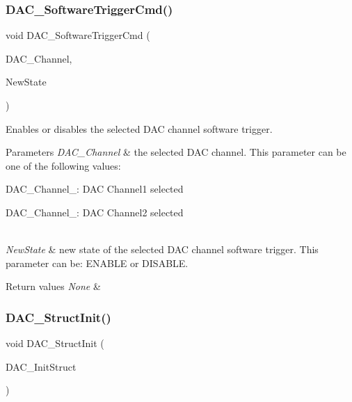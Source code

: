 \subsubsection{\texorpdfstring{DAC\_SoftwareTriggerCmd()}{DAC\_SoftwareTriggerCmd()}}
{\footnotesize\ttfamily void D\+A\+C\+\_\+\+Software\+Trigger\+Cmd (\begin{DoxyParamCaption}\item[{uint32\+\_\+t}]{D\+A\+C\+\_\+\+Channel,  }\item[{\mbox{\hyperlink{group___exported__types_gac9a7e9a35d2513ec15c3b537aaa4fba1}{Functional\+State}}}]{New\+State }\end{DoxyParamCaption})}



Enables or disables the selected D\+AC channel software trigger. 


\begin{DoxyParams}{Parameters}
{\em D\+A\+C\+\_\+\+Channel} & the selected D\+AC channel. This parameter can be one of the following values\+: \begin{DoxyItemize}
\item D\+A\+C\+\_\+\+Channel\+\_\+: D\+AC Channel1 selected \item D\+A\+C\+\_\+\+Channel\+\_\+: D\+AC Channel2 selected \end{DoxyItemize}
\\
\hline
{\em New\+State} & new state of the selected D\+AC channel software trigger. This parameter can be\+: E\+N\+A\+B\+LE or D\+I\+S\+A\+B\+LE. \\
\hline
\end{DoxyParams}

\begin{DoxyRetVals}{Return values}
{\em None} & \\
\hline
\end{DoxyRetVals}
\mbox{\label{group___d_a_c___private___functions_gadfc270974d54cb5fa5f92556015c4046}} 
\subsubsection{\texorpdfstring{DAC\_StructInit()}{DAC\_StructInit()}}
{\footnotesize\ttfamily void D\+A\+C\+\_\+\+Struct\+Init (\begin{DoxyParamCaption}\item[{\mbox{\hyperlink{struct_d_a_c___init_type_def}{D\+A\+C\+\_\+\+Init\+Type\+Def}} $\ast$}]{D\+A\+C\+\_\+\+Init\+Struct }\end{DoxyParamCaption})}




